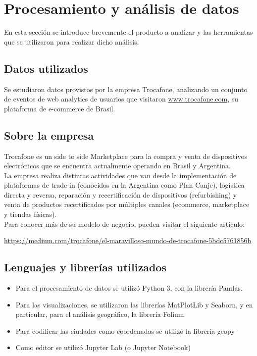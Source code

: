 \documentclass[a4paper ,12pt]{article}
\begin{document}
\tableofcontents %
\newpage

\section{Procesamiento y análisis de datos}\label{sec:intro}

En esta sección se introduce brevemente el producto a analizar y las herramientas que se utilizaron para realizar dicho análisis.



\subsection{Datos utilizados}

Se estudiaron datos provistos por la empresa Trocafone, analizando un conjunto de eventos de web analytics de usuarios que visitaron \url{www.trocafone.com}, su plataforma de e-commerce de Brasil.

\subsection{Sobre la empresa}

 
Trocafone es un side to side Marketplace para la compra y venta de dispositivos electrónicos que se encuentra actualmente operando en Brasil y Argentina. \\


La empresa realiza distintas actividades que van desde la implementación de plataformas de trade-in (conocidos en la Argentina como Plan Canje), logística directa y reversa, reparación y recertificación de dispositivos (refurbishing) y venta de productos recertificados por múltiples canales (ecommerce, marketplace y tiendas físicas).\\ 


Para conocer más de su modelo de negocio, pueden visitar el siguiente artículo:

\url{ https://medium.com/trocafone/el-maravilloso-mundo-de-trocafone-5bdc5761856b}

\subsection{Lenguajes y librerías utilizados}

\begin{itemize}
	
	\item Para el procesamiento de datos se utilizó Python 3, con la librería Pandas.
	
	\item Para las visualizaciones, se utilizaron las librerías MatPlotLib y Seaborn, y en particular, para el análisis geográfico, la librería Folium.
	
	\item Para 	codificar las ciudades como coordenadas se utilizó la librería geopy
	
	\item Como editor se utilizó Jupyter Lab (o Jupyter Notebook)
	
\end{itemize}
\end{document}
